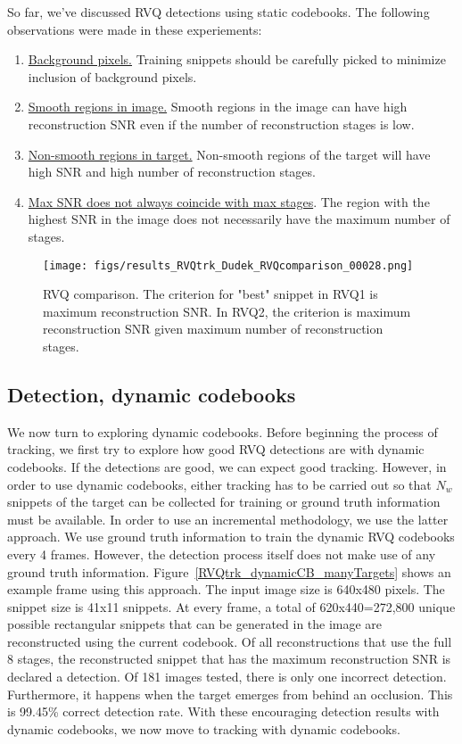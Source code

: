 So far, we've discussed RVQ detections using static codebooks.  The following observations were made in these experiements:

\begin{enumerate}
\item \underline{Background pixels.}  Training snippets should be carefully picked to minimize inclusion of background pixels.
\item \underline{Smooth regions in image.}  Smooth regions in the image can have high reconstruction SNR even if the number of reconstruction stages is low.
\item \underline{Non-smooth regions in target.}   Non-smooth regions of the target will have high SNR and high number of reconstruction stages.
\item \underline{Max SNR does not always coincide with max stages}.  The region with the highest SNR in the image does not necessarily have the maximum number of stages.  
\end{enumerate}

								\begin{figure}[t]
								\centering
								\texttt{[image: figs/results\_RVQtrk\_Dudek\_RVQcomparison\_00028.png]}
								\caption{RVQ comparison.  The criterion for "best" snippet in RVQ1 is maximum reconstruction SNR.  In RVQ2, the criterion is maximum reconstruction SNR given maximum number of reconstruction stages.}
								\label{fig:results_RVQtrk_Dudek_RVQcomparison_00028}
								\end{figure}
\subsection{Detection, dynamic codebooks}
We now turn to exploring dynamic codebooks.  Before beginning the process of tracking, we first try to explore how good RVQ detections are with dynamic codebooks.  If the detections are good, we can expect good tracking.  However, in order to use dynamic codebooks, either tracking has to be carried out so that $N_w$ snippets of the target can be collected for training or ground truth information must be available.  In order to use an incremental methodology, we use the latter approach.  We use ground truth information to train the dynamic RVQ codebooks every 4 frames.  However, the detection process itself does not make use of any ground truth information.  Figure~\ref{RVQtrk_dynamicCB_manyTargets} shows an example frame using this approach.  The input image size is 640x480 pixels.  The snippet size is 41x11 snippets.  At every frame, a total of 620x440=272,800 unique possible rectangular snippets that can be generated in the image are reconstructed using the current codebook.  Of all reconstructions that use the full 8 stages, the reconstructed snippet that has the maximum reconstruction SNR is declared a detection.  Of 181 images tested, there is only one incorrect detection.  Furthermore, it happens when the target emerges from behind an occlusion.  This is 99.45\% correct detection rate.  With these encouraging detection results with dynamic codebooks, we now move to tracking with dynamic codebooks.

